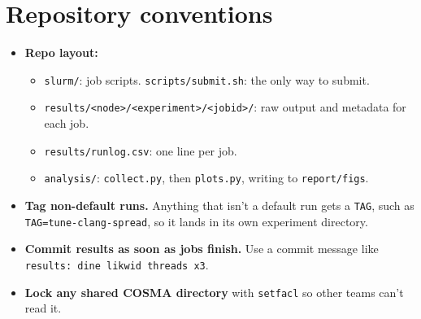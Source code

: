 \documentclass[10pt,a4paper]{article}
\begin{document}
\section{Repository conventions}
\begin{itemize}
  \item \textbf{Repo layout:}
  \begin{itemize}
    \item \texttt{slurm/}: job scripts. \texttt{scripts/submit.sh}: the only way to submit.
    \item \texttt{results/<node>/<experiment>/<jobid>/}: raw output and metadata for each job.
    \item \texttt{results/runlog.csv}: one line per job.
    \item \texttt{analysis/}: \texttt{collect.py}, then \texttt{plots.py}, writing to \texttt{report/figs}.
  \end{itemize}
  \item \textbf{Tag non-default runs.} Anything that isn't a default run gets a \texttt{TAG}, such as \texttt{TAG=tune-clang-spread}, so it lands in its own experiment directory.
  \item \textbf{Commit results as soon as jobs finish.} Use a commit message like \texttt{results: dine likwid threads x3}.
  \item \textbf{Lock any shared COSMA directory} with \texttt{setfacl} so other teams can't read it.
\end{itemize}
\end{document}
